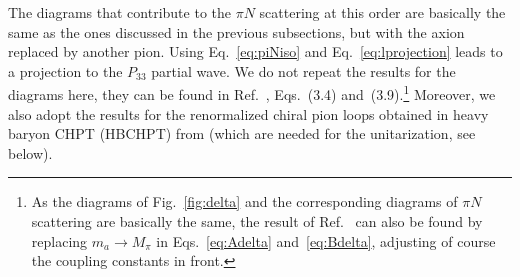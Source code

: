 \documentclass[reprint,amssymb,amsmath,floatfix,aps,prd,groupedaddress,nofootinbib]{revtex4-2}
\begin{document}
The diagrams that contribute to the $\pi N$ scattering at this order are basically the same as the ones
discussed in the previous subsections, but with the axion replaced by another pion. Using Eq.~\eqref{eq:piNiso}
and Eq.~\eqref{eq:lprojection} leads to a projection to the $P_{33}$ partial wave. We do not repeat the results
for the diagrams here, they can be found in Ref.~\cite{Meissner:1999vr}, Eqs.~(3.4) and~(3.9).\footnote{As
the diagrams of Fig.~\ref{fig:delta} and the corresponding diagrams of $\pi N$ scattering are basically the
same, the result of Ref.~\cite{Meissner:1999vr} can also be found by replacing $m_a\to M_\pi$ in Eqs.~\eqref{eq:Adelta}
and~\eqref{eq:Bdelta}, adjusting of course  the coupling constants in front.} Moreover, we also adopt the results
for the renormalized chiral pion loops obtained in heavy baryon CHPT (HBCHPT) from \cite{Fettes:1998ud}
(which are needed for the unitarization, see below).
\end{document}

